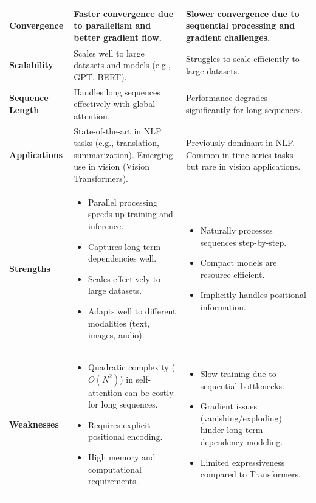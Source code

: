 \begin{longtable}{|>{\raggedright\arraybackslash}p{3.5cm}|>{\raggedright\arraybackslash}p{6cm}|>{\raggedright\arraybackslash}p{6cm}|}
\textbf{Convergence} & Faster convergence due to parallelism and better gradient flow. & Slower convergence due to sequential processing and gradient challenges. \\ \hline

\textbf{Scalability} & Scales well to large datasets and models (e.g., GPT, BERT). & Struggles to scale efficiently to large datasets. \\ \hline

\textbf{Sequence Length} & Handles long sequences effectively with global attention. & Performance degrades significantly for long sequences. \\ \hline

\textbf{Applications} & 
State-of-the-art in NLP tasks (e.g., translation, summarization). Emerging use in vision (Vision Transformers). & 
Previously dominant in NLP. Common in time-series tasks but rare in vision applications. \\ \hline

\textbf{Strengths} & 
\begin{itemize}
    \item Parallel processing speeds up training and inference.
    \item Captures long-term dependencies well.
    \item Scales effectively to large datasets.
    \item Adapts well to different modalities (text, images, audio).
\end{itemize} & 
\begin{itemize}
    \item Naturally processes sequences step-by-step.
    \item Compact models are resource-efficient.
    \item Implicitly handles positional information.
\end{itemize} \\ \hline

\textbf{Weaknesses} & 
\begin{itemize}
    \item Quadratic complexity (\(O(N^2)\)) in self-attention can be costly for long sequences.
    \item Requires explicit positional encoding.
    \item High memory and computational requirements.
\end{itemize} & 
\begin{itemize}
    \item Slow training due to sequential bottlenecks.
    \item Gradient issues (vanishing/exploding) hinder long-term dependency modeling.
    \item Limited expressiveness compared to Transformers.
\end{itemize} \\ \hline


\end{longtable}

